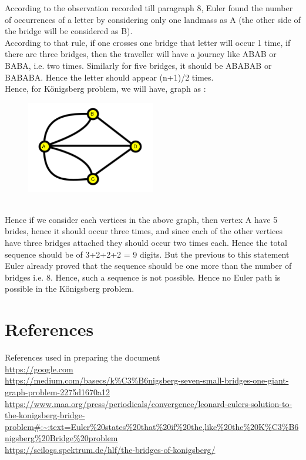 \documentclass[acmsmall]{acmart}
\begin{document}
According to the observation recorded till paragraph 8, Euler found the number of
occurrences of a letter by considering only one landmass as A (the other side of the bridge
will be considered as B).\\

According to that rule, if one crosses one bridge that letter will occur 1 time, if there are
three bridges, then the traveller will have a journey like ABAB or BABA, i.e. two times.
Similarly for five bridges, it should be ABABAB or BABABA. Hence the letter should appear
(n+1)/2 times.\\

Hence, for Königsberg problem, we will have, graph as :
\begin{figure}[h]
  \centering
  \includegraphics[width=0.5\textwidth]{5}
  \caption{}
  \Description{}
\end{figure}
\\
Hence if we consider each vertices in the above graph, then vertex A have 5 brides, hence it
should occur three times, and since each of the other vertices have three bridges attached
they should occur two times each. Hence the total sequence should be of 3+2+2+2 = 9
digits. But the previous to this statement Euler already proved that the sequence should be
one more than the number of bridges i.e. 8. Hence, such a sequence is not possible. Hence
no Euler path is possible in the Königsberg problem.
\clearpage

\section{References}
   
References used in preparing the document\\

\url{https://google.com}\\


\url{https://medium.com/basecs/k\%C3\%B6nigsberg-seven-small-bridges-one-giant-graph-problem-2275d1670a12}\\


\url{https://www.maa.org/press/periodicals/convergence/leonard-eulers-solution-to-the-konigsberg-bridge-problem#:~:text=Euler\%20states\%20that\%20if\%20the,like\%20the\%20K\%C3\%B6nigsberg\%20Bridge\%20problem}\\


\url{https://scilogs.spektrum.de/hlf/the-bridges-of-konigsberg/}
\end{document}
